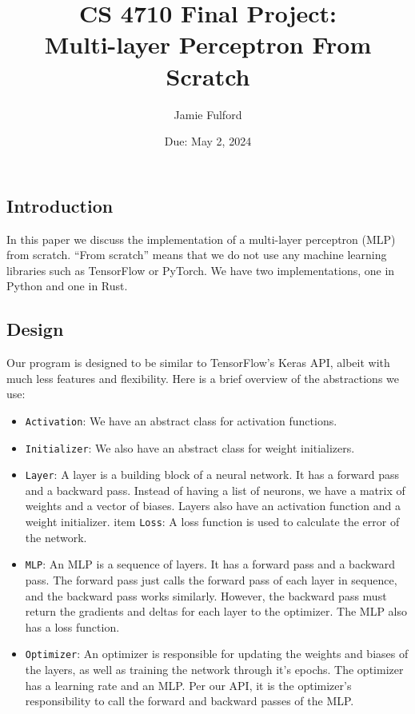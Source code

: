 \documentclass[12pt]{article}
\title{CS 4710 Final Project:\\Multi-layer Perceptron From Scratch}
\date{Due: May 2, 2024}
\author{Jamie Fulford}
\begin{document}
\maketitle

\subsection*{Introduction}

In this paper we discuss the implementation of a multi-layer perceptron (MLP) from scratch.
``From scratch'' means that we do not use any machine learning libraries such as TensorFlow or PyTorch.
We have two implementations, one in Python and one in Rust.

\subsection*{Design}

Our program is designed to be similar to TensorFlow's Keras API, albeit with much less features and flexibility.
Here is a brief overview of the abstractions we use:
\begin{itemize}
    \item \texttt{Activation}: We have an abstract class for activation functions.
    \item \texttt{Initializer}: We also have an abstract class for weight initializers.
    \item \texttt{Layer}: A layer is a building block of a neural network. It has a forward pass and a backward pass.
    Instead of having a list of neurons, we have a matrix of weights and a vector of biases.
    Layers also have an activation function and a weight initializer.
    item \texttt{Loss}: A loss function is used to calculate the error of the network.
    \item \texttt{MLP}: An MLP is a sequence of layers. It has a forward pass and a backward pass.
    The forward pass just calls the forward pass of each layer in sequence, and the backward pass works similarly.
    However, the backward pass must return the gradients and deltas for each layer to the optimizer.
    The MLP also has a loss function.
    \item \texttt{Optimizer}: An optimizer is responsible for updating the weights and biases of the layers,
    as well as training the network through it's epochs.
    The optimizer has a learning rate and an MLP.
    Per our API, it is the optimizer's responsibility to call the forward and backward passes of the MLP.
\end{itemize}
\end{document}
